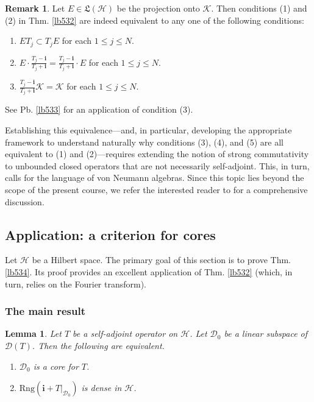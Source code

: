 \documentclass[12pt,b5paper,notitlepage]{article}
\theoremstyle{definition}
\newtheorem{rem}[df]{Remark}
\theoremstyle{plain}
\newtheorem{lm}[df]{Lemma}
\newcommand{\fk}{\mathfrak}
\newcommand{\Dom}{\mathscr{D}}
\newcommand{\im}{\mathbf{i}}
\newcommand{\Rng}{\mathrm{Rng}}
\newcommand{\MH}{\mathcal H}
\newcommand{\MK}{\mathcal K}
\newcommand{\hqed}{\hfill\qedsymbol}
\numberwithin{equation}{section}
\begin{document}
\begin{rem}
Let $E\in\fk L(\MH)$ be the projection onto $\MK$. Then conditions (1) and (2) in Thm. \ref{lb532} are indeed equivalent to any one of the following conditions:
\begin{enumerate}
\item[(3)] $ET_j\subset T_jE$ for each $1\leq j\leq N$. 
\item[(4)] $E\cdot\frac{T_j-\im}{T_j+\im}=\frac{T_j-\im}{T_j+\im}\cdot E$ for each $1\leq j\leq N$.
\item[(5)] $\frac{T_j-\im}{T_j+\im}\MK=\MK$ for each $1\leq j\leq N$.
\end{enumerate}
See Pb. \ref{lb533} for an application of condition (3).

Establishing this equivalence---and, in particular, developing the appropriate framework to understand naturally why conditions (3), (4), and (5) are all equivalent to (1) and (2)---requires extending the notion of strong commutativity to unbounded closed operators that are not necessarily self-adjoint. This, in turn, calls for the language of von Neumann algebras. Since this topic lies beyond the scope of the present course, we refer the interested reader to \cite{Gui-S} for a comprehensive discussion.  \hqed
\end{rem}


\subsection{Application: a criterion for cores}\label{lb536}



Let $\MH$ be a Hilbert space. The primary goal of this section is to prove Thm. \ref{lb534}. Its proof provides an excellent application of Thm. \ref{lb532} (which, in turn, relies on the Fourier transform).

\subsubsection{The main result}


\begin{lm}\label{lb537}
Let $T$ be a self-adjoint operator on $\MH$. Let $\Dom_0$ be a linear subspace of $\Dom(T)$. Then the following are equivalent.
\begin{enumerate}
\item[(1)] $\Dom_0$ is a core for $T$.
\item[(2)] $\Rng(\im+T|_{\Dom_0})$ is dense in $\MH$.
\end{enumerate}
\end{lm}
\end{document}
